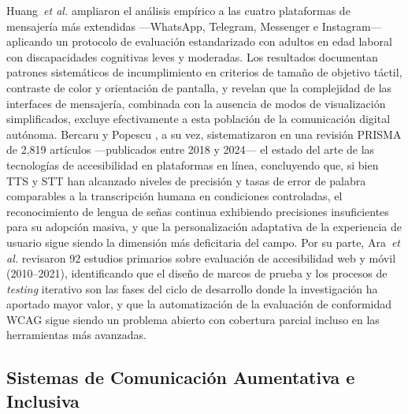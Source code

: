 \documentclass[journal]{IEEEtran}
\begin{document}
				Huang~\textit{et al.} \cite{huang2025} ampliaron el an\'alisis emp\'irico a las cuatro plataformas de mensajer\'ia m\'as extendidas ---WhatsApp, Telegram, Messenger e Instagram--- aplicando un protocolo de evaluaci\'on estandarizado con adultos en edad laboral con discapacidades cognitivas leves y moderadas. Los resultados documentan patrones sistem\'aticos de incumplimiento en criterios de tama\~no de objetivo t\'actil, contraste de color y orientaci\'on de pantalla, y revelan que la complejidad de las interfaces de mensajer\'ia, combinada con la ausencia de modos de visualizaci\'on simplificados, excluye efectivamente a esta poblaci\'on de la comunicaci\'on digital aut\'onoma. Bercaru y Popescu \cite{bercaru2024}, a su vez, sistematizaron en una revisi\'on PRISMA de 2{,}819 art\'iculos ---publicados entre 2018 y 2024--- el estado del arte de las tecnolog\'ias de accesibilidad en plataformas en l\'inea, concluyendo que, si bien TTS y STT han alcanzado niveles de precisi\'on y tasas de error de palabra comparables a la transcripci\'on humana en condiciones controladas, el reconocimiento de lengua de se\~nas continua exhibiendo precisiones insuficientes para su adopci\'on masiva, y que la personalizaci\'on adaptativa de la experiencia de usuario sigue siendo la dimensi\'on m\'as deficitaria del campo. Por su parte, Ara~\textit{et al.} \cite{ara2024} revisaron 92 estudios primarios sobre evaluaci\'on de accesibilidad web y m\'ovil (2010--2021), identificando que el dise\~no de marcos de prueba y los procesos de \textit{testing} iterativo son las fases del ciclo de desarrollo donde la investigaci\'on ha aportado mayor valor, y que la automatizaci\'on de la evaluaci\'on de conformidad WCAG sigue siendo un problema abierto con cobertura parcial incluso en las herramientas m\'as avanzadas.
			
		\subsection{Sistemas de Comunicaci\'on Aumentativa e Inclusiva}
\end{document}
